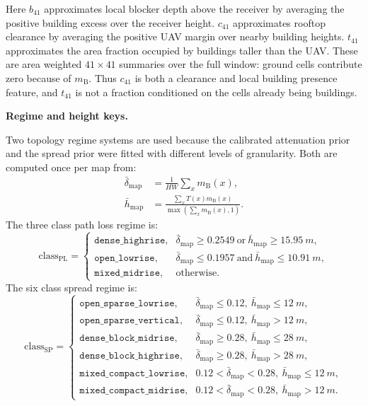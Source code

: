 Here \(b_{41}\) approximates local blocker depth above the receiver by averaging
the positive building excess over the receiver height. \(c_{41}\) approximates
rooftop clearance by averaging the positive UAV margin over nearby building
heights. \(t_{41}\) approximates the area fraction occupied by buildings taller
than the UAV. These are area weighted \(41\times41\) summaries over the full
window: ground cells contribute zero because of \(m_{\mathrm{B}}\). Thus
\(c_{41}\) is both a clearance and local building presence feature, and
\(t_{41}\) is not a fraction conditioned on the cells already being buildings.

\par\smallskip
\noindent\textbf{Regime and height keys.}\par
\noindent
Two topology regime systems are used because the calibrated attenuation prior
and the spread prior were fitted with different levels of granularity. Both are
computed once per map from:
\begin{align}
  \bar\delta_{\mathrm{map}}
  &=
  \frac{1}{HW}\sum_x m_{\mathrm{B}}(x),
  \label{eq:map_density_support}\\
  \bar h_{\mathrm{map}}
  &=
  \frac{\sum_x T(x)m_{\mathrm{B}}(x)}
       {\max(\sum_x m_{\mathrm{B}}(x),1)}.
  \label{eq:map_height_support}
\end{align}
The three class path loss regime is:
\begin{equation}
\mathrm{class}_{\mathrm{PL}} =
\begin{cases}
\texttt{dense\_highrise}, & \bar\delta_{\mathrm{map}}\ge0.2549\ \text{or}\ \bar h_{\mathrm{map}}\ge\SI{15.95}{m},\\
\texttt{open\_lowrise}, & \bar\delta_{\mathrm{map}}\le0.1957\ \text{and}\ \bar h_{\mathrm{map}}\le\SI{10.91}{m},\\
\texttt{mixed\_midrise}, & \text{otherwise}.
\end{cases}
\label{eq:topology_class_pl_support}
\end{equation}
The six class spread regime is:
\begin{equation}
\mathrm{class}_{\mathrm{SP}} =
\begin{cases}
\texttt{open\_sparse\_lowrise}, & \bar\delta_{\mathrm{map}}\le0.12,\ \bar h_{\mathrm{map}}\le\SI{12}{m},\\
\texttt{open\_sparse\_vertical}, & \bar\delta_{\mathrm{map}}\le0.12,\ \bar h_{\mathrm{map}}>\SI{12}{m},\\
\texttt{dense\_block\_midrise}, & \bar\delta_{\mathrm{map}}\ge0.28,\ \bar h_{\mathrm{map}}\le\SI{28}{m},\\
\texttt{dense\_block\_highrise}, & \bar\delta_{\mathrm{map}}\ge0.28,\ \bar h_{\mathrm{map}}>\SI{28}{m},\\
\texttt{mixed\_compact\_lowrise}, & 0.12<\bar\delta_{\mathrm{map}}<0.28,\ \bar h_{\mathrm{map}}\le\SI{12}{m},\\
\texttt{mixed\_compact\_midrise}, & 0.12<\bar\delta_{\mathrm{map}}<0.28,\ \bar h_{\mathrm{map}}>\SI{12}{m}.
\end{cases}
\label{eq:topology_class_sp_support}
\end{equation}

